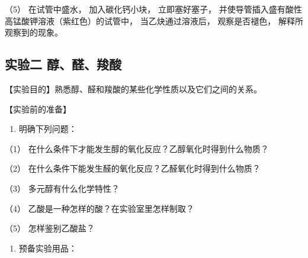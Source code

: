 （5） 在试管中盛水， 加入碳化钙小块， 立即塞好塞子，
并使导管插入盛有酸性高锰酸钾溶液（紫红色）的试管中， 当乙炔通过溶液后，
观察是否褪色， 解释所观察到的现象。

\subsection{实验二 醇、醛、羧酸}

【实验目的】熟悉醇、醛和羧酸的某些化学性质以及它们之间的关系。

【实验前的准备】

\begin{enumerate}
\item
  明确下列问题：
\end{enumerate}

（1） 在什么条件下才能发生醇的氧化反应？乙醇氧化时得到什么物质？

（2） 在什么条件下能发生醛的氧化反应？乙醛氧化时得到什么物质？

（3） 多元醇有什么化学特性？

（4） 乙酸是一种怎样的酸？在实验室里怎样制取？

（5） 怎样鉴别乙酸盐？

\begin{enumerate}[start=2]
\item
  预备实验用品：
\end{enumerate}

